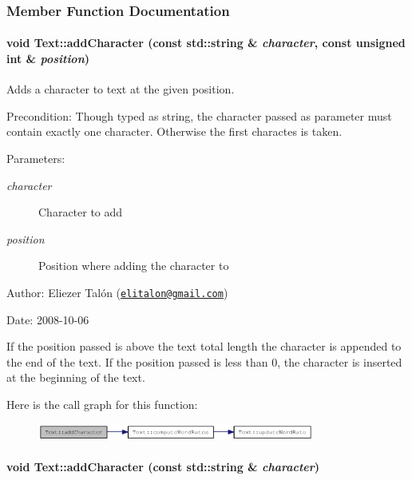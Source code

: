 \subsubsection{Member Function Documentation}
\hypertarget{class_text_585f0fde5ef0796ccde09a059d90cc3b}{
\paragraph[{addCharacter}]{\setlength{\rightskip}{0pt plus 5cm}void Text::addCharacter (const std::string \& {\em character}, \/  const unsigned int \& {\em position})}\hfill}
\label{class_text_585f0fde5ef0796ccde09a059d90cc3b}


Adds a character to text at the given position. 

\begin{Desc}
\item[Precondition:]Though typed as string, the character passed as parameter must contain exactly one character. Otherwise the first charactes is taken.\end{Desc}
\begin{Desc}
\item[Parameters:]
\begin{description}
\item[{\em character}]Character to add \item[{\em position}]Position where adding the character to\end{description}
\end{Desc}
\begin{Desc}
\item[Author:]Eliezer Talón (\href{mailto:elitalon@gmail.com}{\tt elitalon@gmail.com}) \end{Desc}
\begin{Desc}
\item[Date:]2008-10-06\end{Desc}
If the position passed is above the text total length the character is appended to the end of the text. If the position passed is less than 0, the character is inserted at the beginning of the text. 

Here is the call graph for this function:\nopagebreak
\begin{figure}[H]
\begin{center}
\leavevmode
\includegraphics[width=258pt]{class_text_585f0fde5ef0796ccde09a059d90cc3b_cgraph}
\end{center}
\end{figure}
\hypertarget{class_text_d2c0cb733cef33657a44e4efc9e518ee}{
\paragraph[{addCharacter}]{\setlength{\rightskip}{0pt plus 5cm}void Text::addCharacter (const std::string \& {\em character})}\hfill}
\label{class_text_d2c0cb733cef33657a44e4efc9e518ee}


